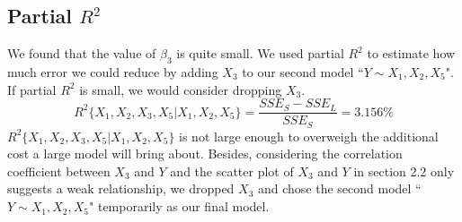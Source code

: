 \documentclass[a4paper,11pt,onecolumn,twoside]{article}
\begin{document}
\subsection{Partial $R^2$}
We found that the value of $\beta_3$ is quite small. We used partial $R^2$ to estimate how much error we could reduce by adding $X_3$ to our second model ``$Y\sim X_1,X_2,X_5$". If partial $R^2$ is small, we would consider dropping $X_3$.
\begin{equation}
R^2\{X_1,X_2,X_3,X_5|X_1,X_2,X_5\}=\frac{SSE_{S}-SSE_{L}}{SSE_{S}}=3.156\%
\end{equation}
$R^2\{X_1,X_2,X_3,X_5|X_1,X_2,X_5\}$ is not large enough to overweigh the additional cost a large model will bring about. Besides, considering  the correlation coefficient between $X_3$ and $Y$ and the scatter plot of $X_3$ and $Y$ in section 2.2 only suggests a weak relationship,  we dropped $X_3$ and chose the second model ``$Y\sim X_1,X_2,X_5$" temporarily as our final model.
\end{document}
